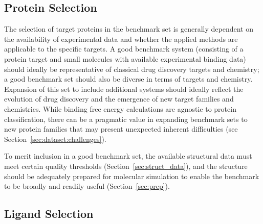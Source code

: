 \documentclass[9pt,bestpractices,pubversion]{livecoms}
\begin{document}
\subsection{Protein Selection}
\label{sec:dataset:proteins}
The selection of target proteins in the benchmark set is generally dependent
on the availability of experimental data and whether the applied methods are applicable to the specific targets.
%
A good benchmark system (consisting of a protein target and small molecules with available experimental binding data) should ideally be representative of classical drug discovery targets and chemistry; a good benchmark set should also be diverse in terms of targets and chemistry. 
Expansion of this set to include additional systems should ideally reflect the evolution of drug discovery and the emergence of new target families and chemistries.
%
While binding free energy calculations are agnostic to protein classification, there can be a pragmatic value in expanding benchmark sets to new protein families that may present unexpected inherent difficulties (see Section~\ref{sec:dataset:challenges}).

To merit inclusion in a good benchmark set, the available structural data must meet certain quality thresholds (Section~\ref{sec:struct_data}), and the structure should be adequately prepared for molecular simulation to enable the benchmark to be broadly and readily useful (Section~\ref{sec:prep}).

\subsection{Ligand Selection}
\label{sec:dataset:ligands}
\end{document}
